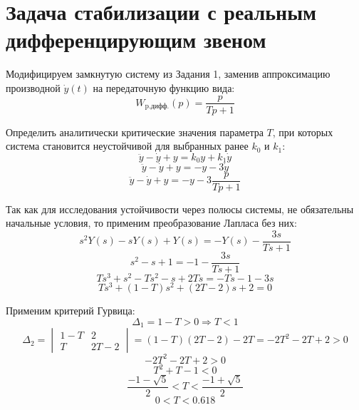 \chapter{Задача стабилизации с реальным дифференцирующим звеном}
Модифицируем замкнутую систему из Задания 1, заменив аппроксимацию 
производной $\dot 𝑦(𝑡)$ на передаточную функцию вида:
\[
W_{\text{p.дифф.}}(p) = \frac{p}{Tp + 1}
\]

Определить аналитически критические значения параметра $T$, при которых система
становится неустойчивой для выбранных ранее $k_0$ и $k_1$:
\[
\ddot{y} - \dot{y} + y = k_0y + k_1\dot{y}
\]
\[
\ddot{y} - \dot{y} + y = -y -3\dot{y}
\]
\[
\ddot{y} - \dot{y} + y = -y -3\frac{p}{Tp + 1}
\]

Так как для исследования устойчивости через полюсы системы, не обязательны
начальные условия, то применим преобразование Лапласа без них:
\[
    s^2 Y(s) - sY(s) + Y(s) = -Y(s) - \frac{3s}{Ts+1}
\]
\[
    s^2 - s + 1 = -1 - \frac{3s}{Ts+1}
\]
\[
    Ts^3 + s^2 - Ts^2 - s + 2Ts = -Ts - 1 - 3s
\]
\[
    Ts^3 + (1 - T)s^2 + (2T - 2)s + 2 = 0
\]

Применим критерий Гурвица:
\[
    \Delta_1 = 1 - T > 0 \Rightarrow T < 1
\]
\[
    \Delta_2 = 
    \begin{vmatrix}
        1 - T & 2 \\
        T & 2T - 2
    \end{vmatrix}
    = (1 - T)(2T - 2) - 2T = -2T^2 - 2T + 2 > 0\]
\[
    -2T^2 - 2T + 2 > 0
\]
\[
    T^2 + T - 1 < 0
\]
\[
    \frac{-1 - \sqrt{5}}{2} < T < \frac{-1 + \sqrt{5}}{2}
\]
\[
    0 < T < 0.618
\]

